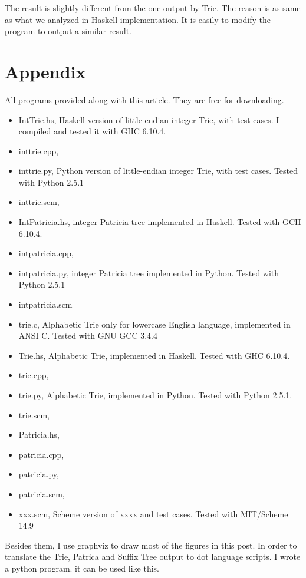 \documentclass{article}
\begin{document}
The result is slightly different from the one output by Trie. The reason is
as same as what we analyzed in Haskell implementation. It is easily to modify
the program to output a similar result.

\section{Appendix} \label{appendix}
All programs provided along with this article. They are free for downloading.
\begin{itemize}
\item IntTrie.hs, Haskell version of little-endian integer Trie, with test cases. I compiled
and tested it with GHC 6.10.4.
\item inttrie.cpp,
\item inttrie.py, Python version of little-endian integer Trie, with test cases. Tested
with Python 2.5.1
\item inttrie.scm,
\item IntPatricia.hs, integer Patricia tree implemented in
Haskell. Tested with GCH 6.10.4. 
\item intpatricia.cpp,
\item intpatricia.py, integer Patricia tree implemented in
Python. Tested with Python 2.5.1
\item intpatricia.scm
\item trie.c, Alphabetic Trie only for lowercase English language,
implemented in ANSI C. Tested with GNU GCC 3.4.4
\item Trie.hs, Alphabetic Trie, implemented in Haskell. Tested with
GHC 6.10.4.
\item trie.cpp,
\item trie.py, Alphabetic Trie, implemented in Python. Tested with
Python 2.5.1.
\item trie.scm,
\item Patricia.hs,
\item patricia.cpp,
\item patricia.py,
\item patricia.scm,
\item xxx.scm, Scheme version of xxxx and test cases. Tested
with MIT/Scheme 14.9
\end{itemize}

Besides them, I use graphviz to draw most of the figures in this post. In order to
translate the Trie, Patrica and Suffix Tree output to dot language scripts. I wrote a python program.
it can be used like this.
\end{document}
